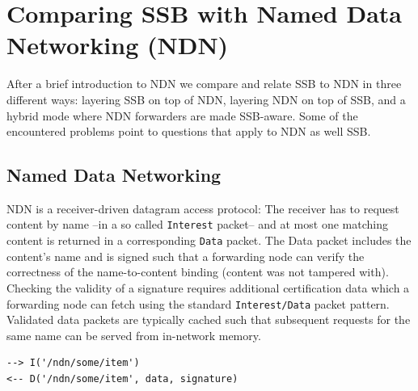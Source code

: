 \documentclass[9pt,sigconf,rewiew]{acmart}
\begin{document}



\section{Comparing SSB with Named Data Networking (NDN)}
\label{sect:NDN}

After a brief introduction to NDN we compare and relate SSB to NDN in
three different ways: layering SSB on top of NDN, layering NDN on top
of SSB, and a hybrid mode where NDN forwarders are made SSB-aware.
Some of the encountered problems point to questions that apply to NDN
as well SSB.

\subsection{Named Data Networking}

NDN is a receiver-driven datagram access protocol: The receiver has to
request content by name --in a so called {\tt Interest} packet-- and
at most one matching content is returned in a corresponding {\tt Data}
packet. The Data packet includes the content's name and is signed such
that a forwarding node can verify the correctness of the
name-to-content binding (content was not tampered with). Checking the validity of a signature requires
additional certification data which a forwarding node can fetch using
the standard {\tt Interest/Data} packet pattern. Validated data
packets are typically cached such that subsequent requests for the
same name can be served from in-network memory.

\begin{verbatim}
--> I('/ndn/some/item')
<-- D('/ndn/some/item', data, signature)
\end{verbatim}
\end{document}
